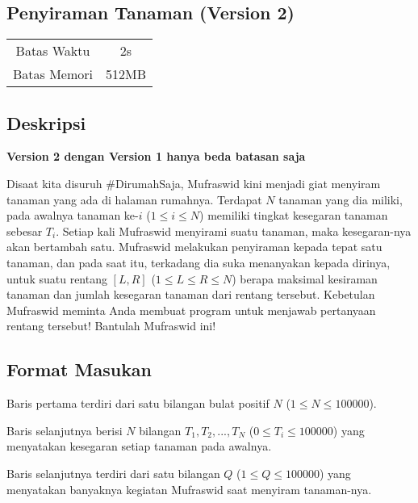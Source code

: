 \documentclass{article}
\begin{document}
\begin{center}
    \section*{Penyiraman Tanaman (Version 2)} %

    \begin{tabular}{ | c c | }
        \hline
        Batas Waktu  & 2s \\    %
        Batas Memori & 512MB \\  %
        \hline
    \end{tabular}
\end{center}

\subsection*{Deskripsi}
\vspace{-\baselineskip}
\begin{center}
\textbf{Version 2 dengan Version 1 hanya beda batasan saja}
\end{center}
\vspace{-\baselineskip}
Disaat kita disuruh \#DirumahSaja, Mufraswid kini menjadi giat menyiram tanaman yang ada di halaman rumahnya. Terdapat $N$ tanaman yang dia miliki, pada awalnya tanaman ke-$i$ ($1 \leq i \leq N$) memiliki tingkat kesegaran tanaman sebesar $T_i$. Setiap kali Mufraswid menyirami suatu tanaman, maka kesegaran-nya akan bertambah satu. Mufraswid melakukan penyiraman kepada tepat satu tanaman, dan pada saat itu, terkadang dia suka menanyakan kepada dirinya, untuk suatu rentang $\left[L, R \right]$ ($1 \leq L \leq R \leq N$) berapa maksimal kesiraman tanaman dan jumlah kesegaran tanaman dari rentang tersebut. Kebetulan Mufraswid meminta Anda membuat program untuk menjawab pertanyaan rentang tersebut! Bantulah Mufraswid ini!

\subsection*{Format Masukan}

Baris pertama terdiri dari satu bilangan bulat positif $N$ ($1 \leq N \leq 100000$).

Baris selanjutnya berisi $N$ bilangan $T_1, T_2, ..., T_N$ ($0 \leq T_i \leq 100000$) yang menyatakan kesegaran setiap tanaman pada awalnya.

Baris selanjutnya terdiri dari satu bilangan $Q$ ($1 \leq Q \leq 100000$) yang menyatakan banyaknya kegiatan Mufraswid saat menyiram tanaman-nya.
\end{document}
